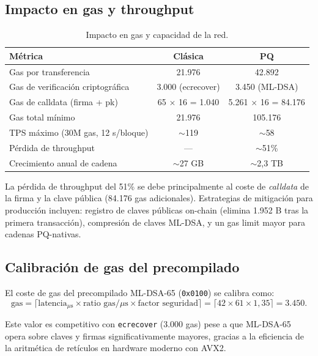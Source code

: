 \subsection{Impacto en gas y throughput}

\begin{table}[htbp]
\centering
\caption{Impacto en gas y capacidad de la red.}
\label{tab:gas_impact}
\begin{tabular}{@{}lcc@{}}
\toprule
\textbf{Métrica} & \textbf{Clásica} & \textbf{PQ} \\
\midrule
Gas por transferencia & 21.976 & 42.892 \\
Gas de verificación criptográfica & 3.000 (ecrecover) & 3.450 (ML-DSA) \\
Gas de calldata (firma + pk) & 65 $\times$ 16 = 1.040 & 5.261 $\times$ 16 = 84.176 \\
Gas total mínimo & 21.976 & 105.176 \\
TPS máximo (30M gas, 12 s/bloque) & $\sim$119 & $\sim$58 \\
Pérdida de throughput & --- & $\sim$51\% \\
Crecimiento anual de cadena & $\sim$27 GB & $\sim$2,3 TB \\
\bottomrule
\end{tabular}
\end{table}

La pérdida de throughput del 51\% se debe principalmente al coste de \emph{calldata} de la firma y la clave pública (84.176 gas adicionales). Estrategias de mitigación para producción incluyen: registro de claves públicas on-chain (elimina 1.952 B tras la primera transacción), compresión de claves ML-DSA, y un gas limit mayor para cadenas PQ-nativas.

\subsection{Calibración de gas del precompilado}

El coste de gas del precompilado ML-DSA-65 (\texttt{0x0100}) se calibra como:
\begin{equation}
  \text{gas} = \lceil \text{latencia}_{\mu\text{s}} \times \text{ratio gas/}\mu\text{s} \times \text{factor seguridad} \rceil = \lceil 42 \times 61 \times 1,35 \rceil = 3.450.
\end{equation}

Este valor es competitivo con \texttt{ecrecover} (3.000 gas) pese a que ML-DSA-65 opera sobre claves y firmas significativamente mayores, gracias a la eficiencia de la aritmética de retículos en hardware moderno con AVX2.


